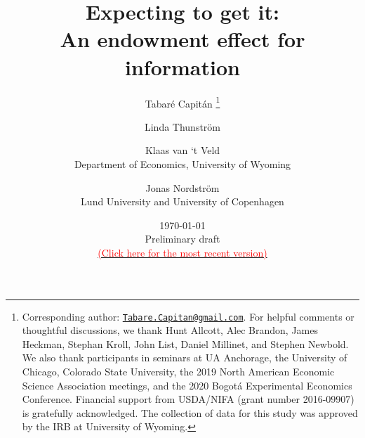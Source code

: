 
\title{\vspace{-3cm}
      Expecting to get it: \\ An endowment effect for information
      }

\author{Tabaré Capitán
          \thanks{Corresponding author: \href{mailto:Tabare.Capitan@gmail.com}{\texttt{Tabare.Capitan@gmail.com}}. For helpful comments or thoughtful discussions, we thank Hunt Allcott, Alec Brandon, James Heckman, Stephan Kroll, John List, Daniel Millinet, and Stephen Newbold. We also thank participants in seminars at UA Anchorage, the University of Chicago, Colorado State University, the 2019 North American Economic Science Association meetings, and the 2020 Bogotá Experimental Economics Conference. Financial support from USDA/NIFA (grant number 2016-09907) is gratefully acknowledged. The collection of data for this study was approved by the IRB at University of Wyoming.}
        \and
        Linda Thunström
        \and
        Klaas van ‘t Veld
          \\ \small{Department of Economics, University of Wyoming}
        \and
        Jonas Nordström
          \\ \small{Lund University and University of Copenhagen}
        }

\date{\vspace{0.5cm} \today \\ \vspace{0.5cm} {\small{Preliminary draft}} \\ \href{https://www.tabarecapitan.com/jmp/}{\small{\textcolor{red}{(Click here for the most recent version)}}}}

\maketitle

\thispagestyle{empty}   %


